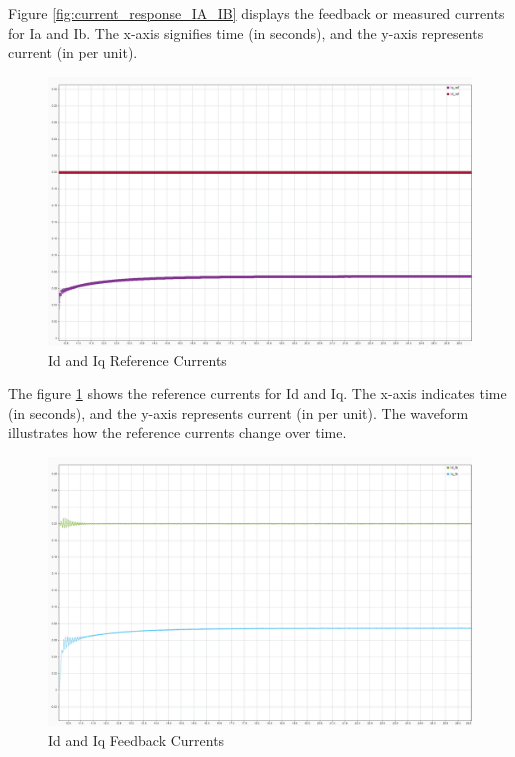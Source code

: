 Figure \ref{fig:current_response_IA_IB} displays the feedback or measured currents for Ia and Ib. The x-axis signifies time (in seconds), and the y-axis represents current (in per unit).


\begin{figure}[H]
	\centering
	\includegraphics[width=6in]{sections/section3/images/simulationResutls/Id_ref_Iq_ref.png}
	\caption{Id and Iq Reference Currents}
	\label{fig:current_response_Id_ref_Iq_ref}
\end{figure}

The figure \ref{fig:current_response_Id_ref_Iq_ref} shows the reference currents for Id and Iq. The x-axis indicates time (in seconds), and the y-axis represents current (in per unit). The waveform illustrates how the reference currents change over time.


\begin{figure}[H]
	\centering
	\includegraphics[width=6in]{sections/section3/images/simulationResutls/Id_fb_Iq_fb.png}
	\caption{Id and Iq Feedback Currents}
	\label{fig:current_response_Id_fb_Iq_fb}
\end{figure}


